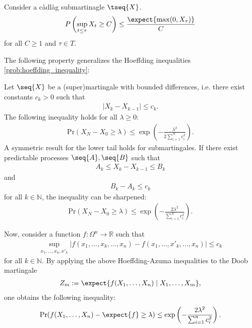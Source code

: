    \begin{property}\label{prob:doob_inequality}
        Consider a c\`adl\`ag submartinagle $\tseq{X}$.
        \begin{gather}
            P\left(\sup_{t\leq\tau}X_t\geq C\right)\leq\frac{\expect{\max(0, X_\tau)}}{C}
        \end{gather}
        for all $C\geq1$ and $\tau\in T$.
    \end{property}

    The following property generalizes the Hoeffding inequalities \ref{prob:hoeffding_inequality}:
    \begin{property}\label{prob:hoeffding_azuma}
        Let $\seq{X}$ be a (super)martingale with bounded differences, i.e. there exist constants $c_k>0$ such that
        \begin{gather}
            |X_k-X_{k-1}|\leq c_k.
        \end{gather}
        The following inequality holds for all $\lambda\geq0$:
        \begin{gather}
            \mathrm{Pr}(X_N-X_0\geq\lambda)\leq\exp\left(-\frac{\lambda^2}{2\sum_{i=1}^Nc_i^2}\right).
        \end{gather}
        A symmetric result for the lower tail holds for submartingales. If there exist predictable processes $\seq{A},\seq{B}$ such that
        \begin{gather}
            A_k\leq X_k-X_{k-1}\leq B_k
        \end{gather}
        and
        \begin{gather}
            B_k-A_k\leq c_k
        \end{gather}
        for all $k\in\mathbb{N}$, the inequality can be sharpened:
        \begin{gather}
            \mathrm{Pr}(X_N-X_0\geq\lambda)\leq\exp\left(-\frac{2\lambda^2}{\sum_{i=1}^Nc_i^2}\right).
        \end{gather}

        Now, consider a function $f:\Omega^n\rightarrow\mathbb{R}$ such that
        \begin{gather}
            \sup_{x_1,\ldots,x_n,x'_k}|f(x_1,\ldots,x_k,\ldots,x_n)-f(x_1,\ldots,x'_k,\ldots,x_n)|\leq c_k
        \end{gather}
        for all $k\in\mathbb{N}$. By applying the above Hoeffding-Azuma inequalities to the Doob martingale
        \begin{gather}
            Z_m:=\expect{f(X_1,\ldots,X_n)\mid X_1,\ldots,X_m},
        \end{gather}
        one obtains the following inequality:
        \begin{gather}
            \mathrm{Pr}(f(X_1,\ldots,X_n)-\expect{f}\geq\lambda)\leq\exp\left(-\frac{2\lambda^2}{\sum_{i=1}^nc_i^2}\right).
        \end{gather}
    \end{property}

